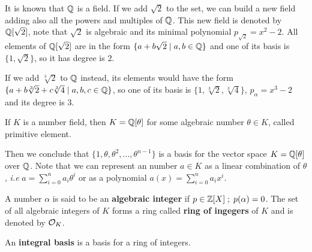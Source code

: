 \documentclass[Ingles]{ic-tese-v3}
\begin{document}
\begin{example}
  It is known that $\mathbb{Q}$ is a field. If we add $\sqrt{2}$ to the set, we
  can build a new field adding also all the powers and multiples of
  $\mathbb{Q}$. This new field is denoted by $\mathbb{Q}[\sqrt{2}]$, note that
  $\sqrt{2}$ is algebraic and its minimal polynomial $p_{\sqrt{2}} = x^2-2$. All
  elements of $\mathbb{Q}[\sqrt{2}]$ are in the form $\{a+b\sqrt{2} \;|\; a,b \in
  \mathbb{Q}\}$ and one of its basis is $\{1, \sqrt{2}\}$, so it has degree is
  $2$.
\end{example}

\begin{example}
  If we add $\sqrt[3]{2}$ to $\mathbb{Q}$ instead, its elements would have the
  form $\{a + b\sqrt[3]{2} + c\sqrt[3]{4} \;|\; a,b,c \in \mathbb{Q}\}$, so one of
  its basis is $\{1 ,\sqrt[3]{2} ,\sqrt[3]{4}\}$, $p_\alpha = x^3 - 2$ and its degree
  is $3$.
\end{example}

\begin{theorem}
   If $K$ is a number field, then $K = \mathbb{Q}[\theta]$ for some
  algebraic number $\theta \in K$, called primitive element.
\end{theorem}

Then we conclude that \(\{1, \theta, \theta^2, ... , \theta^{n-1}\}\) is a basis for the vector
space \(K = \mathbb{Q}[\theta]\) over \(\mathbb{Q}\). Note that we can represent an number \(a \in K\) as a linear combination of \(\theta\), \emph{i.e} \(a = \sum^n_{i=0}{a_i\theta^i}\) or as a polynomial \(a(x) = \sum^n_{i=0}{a_ix^i}\).

\begin{definition}
A number $\alpha$ is said to be an \textbf{algebraic integer} if $ p \in \mathbb{Z}[X] \;;\; p(\alpha) = 0$. The set of all algebraic integers of $K$ forms a ring called \textbf{ring of ingegers} of $K$ and is denoted by $\mathcal{O}_K$.
\end{definition}

\begin{definition}
An \textbf{integral basis} is a basis for a ring of integers. 
\end{definition}
\end{document}
